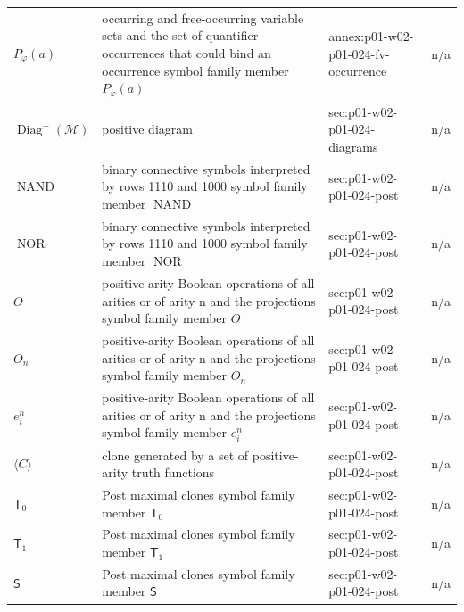 \begin{longtable}{@{}p{}p{}p{}p{}@{}}
\(P_\varphi(a)\) & occurring and free-occurring variable sets and the set of quantifier occurrences that could bind an occurrence symbol family member \(P_\varphi(a)\) & annex:\allowbreak{}p01-\allowbreak{}w02-\allowbreak{}p01-\allowbreak{}024-\allowbreak{}fv-\allowbreak{}occurrence & n/a \\
\(\operatorname{Diag}^+(\mathcal M)\) & positive diagram & sec:\allowbreak{}p01-\allowbreak{}w02-\allowbreak{}p01-\allowbreak{}024-\allowbreak{}diagrams & n/a \\
\(\operatorname{NAND}\) & binary connective symbols interpreted by rows 1110 and 1000 symbol family member \(\operatorname{NAND}\) & sec:\allowbreak{}p01-\allowbreak{}w02-\allowbreak{}p01-\allowbreak{}024-\allowbreak{}post & n/a \\
\(\operatorname{NOR}\) & binary connective symbols interpreted by rows 1110 and 1000 symbol family member \(\operatorname{NOR}\) & sec:\allowbreak{}p01-\allowbreak{}w02-\allowbreak{}p01-\allowbreak{}024-\allowbreak{}post & n/a \\
\(O\) & positive-arity Boolean operations of all arities or of arity n and the projections symbol family member \(O\) & sec:\allowbreak{}p01-\allowbreak{}w02-\allowbreak{}p01-\allowbreak{}024-\allowbreak{}post & n/a \\
\(O_n\) & positive-arity Boolean operations of all arities or of arity n and the projections symbol family member \(O_n\) & sec:\allowbreak{}p01-\allowbreak{}w02-\allowbreak{}p01-\allowbreak{}024-\allowbreak{}post & n/a \\
\(e^n_i\) & positive-arity Boolean operations of all arities or of arity n and the projections symbol family member \(e^n_i\) & sec:\allowbreak{}p01-\allowbreak{}w02-\allowbreak{}p01-\allowbreak{}024-\allowbreak{}post & n/a \\
\(\langle C\rangle\) & clone generated by a set of positive-arity truth functions & sec:\allowbreak{}p01-\allowbreak{}w02-\allowbreak{}p01-\allowbreak{}024-\allowbreak{}post & n/a \\
\(\mathsf T_0\) & Post maximal clones symbol family member \(\mathsf T_0\) & sec:\allowbreak{}p01-\allowbreak{}w02-\allowbreak{}p01-\allowbreak{}024-\allowbreak{}post & n/a \\
\(\mathsf T_1\) & Post maximal clones symbol family member \(\mathsf T_1\) & sec:\allowbreak{}p01-\allowbreak{}w02-\allowbreak{}p01-\allowbreak{}024-\allowbreak{}post & n/a \\
\(\mathsf S\) & Post maximal clones symbol family member \(\mathsf S\) & sec:\allowbreak{}p01-\allowbreak{}w02-\allowbreak{}p01-\allowbreak{}024-\allowbreak{}post & n/a \\

\end{longtable}

